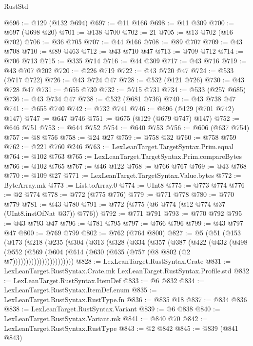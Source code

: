\begin{lexlean}{RustStd}
\begin{coremodule}
{\begin{coremodule}
{{{{{{{{{{{{{{{{{{{{{{{{{{@696 := @129 (@132 @694)
@697 := @11 @166
@698 := @11 @309
@700 := @697 (@698 @20)
@701 := @138 @700
@702 := 21
@705 := @13 @702 (@16 @702)
@706 := @36 @705
@707 := @44 @166
@708 := @89 @707
@709 := @43 @708
@710 := @89 @463
@712 := @43 @710 @47
@713 := @709 @712
@714 := @706 @713
@715 := @335 @714
@716 := @44 @309
@717 := @43 @716
@719 := @43 @707 @202
@720 := @226 @719
@722 := @43 @720 @47
@724 := @533 (@717 @722)
@726 := @43 @724 @47
@728 := @532 (@121 @726)
@730 := @43 @728 @47
@731 := @655 @730
@732 := @715 @731
@734 := @533 (@257 @685)
@736 := @43 @734 @47
@738 := @532 (@681 @736)
@740 := @43 @738 @47
@741 := @655 @740
@742 := @732 @741
@746 := @696 (@129 (@701 @742) @147)
@747 := @647 @746
@751 := @675 (@129 (@679 @747) @147)
@752 := @646 @751
@753 := @644 @752
@754 := @640 @753
@756 := @606 (@637 @754)
@757 := @8 @756
@758 := @24 @27
@759 := @758 @32
@760 := @758 @759
@762 := @221 @760 @246
@763 := LexLeanTarget.TargetSyntax.Prim.equal
@764 := @102 @763
@765 := LexLeanTarget.TargetSyntax.Prim.compareBytes
@766 := @102 @765
@767 := @46 @122
@768 := @766 @767
@769 := @43 @768
@770 := @109 @27
@771 := LexLeanTarget.TargetSyntax.Value.bytes
@772 := ByteArray.mk
@773 := List.toArray.{0}
@774 := UInt8
@775 := @773 @774
@776 := @2 @774
@778 := @772 (@775 @776)
@779 := @771 @778
@780 := @770 @779
@781 := @43 @780
@791 := @772 (@775 (@6 @774 (@12 @774 @37 (UInt8.instOfNat @37)) @776))
@792 := @771 @791
@793 := @770 @792
@795 := @43 @793 @47
@796 := @781 @795
@797 := @766 @796
@799 := @43 @797 @47
@800 := @769 @799
@802 := @762 (@764 @800)
@827 := @5
    (@51
      (@153
        (@173
          (@218
            (@235
              (@304
                (@313
                  (@328
                    (@334
                      (@357
                        (@387
                          (@422
                            (@432
                              (@498
                                (@552
                                  (@569
                                    (@604
                                      (@614 (@630 (@635 (@757 (@8 @802 (@2 @7)))))))))))))))))))))))
@828 := LexLeanTarget.RustSyntax.Crate
@831 := LexLeanTarget.RustSyntax.Crate.mk LexLeanTarget.RustSyntax.Profile.std
@832 := LexLeanTarget.RustSyntax.ItemDef
@833 := @6 @832
@834 := LexLeanTarget.RustSyntax.ItemDef.enum
@835 := LexLeanTarget.RustSyntax.RustType.fn
@836 := @835 @18
@837 := @834 @836
@838 := LexLeanTarget.RustSyntax.Variant
@839 := @6 @838
@840 := LexLeanTarget.RustSyntax.Variant.mk
@841 := @840 @70
@842 := LexLeanTarget.RustSyntax.RustType
@843 := @2 @842
@845 := @839 (@841 @843)
}}}}}}}}}}}}}}}}}}}}}}}}}}
\end{coremodule}}
\end{coremodule}
\end{lexlean}
